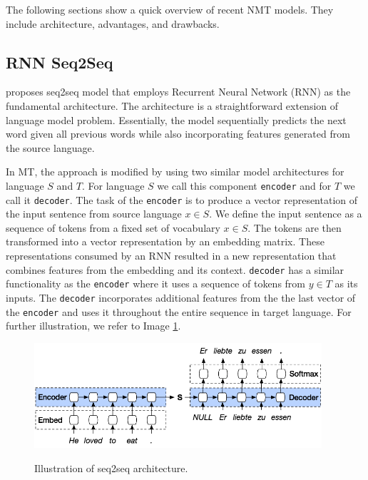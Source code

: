 The following sections show a quick overview of recent NMT models. They include architecture, advantages, and drawbacks.

\subsection{RNN Seq2Seq}
\cite{sutskever2014sequence} proposes seq2seq model that employs Recurrent Neural Network (RNN) as the fundamental architecture. The architecture is a straightforward extension of language model problem. Essentially, the model sequentially predicts the next word given all previous words while also incorporating features generated from the source language.

In MT, the approach is modified by using two similar model architectures for language $S$ and $T$. For language $S$ we call this component \texttt{encoder} and for $T$ we call it \texttt{decoder}.
The task of the \texttt{encoder} is to produce a vector representation of the input sentence from source language $x \in S$. We define the input sentence as a sequence of tokens from a fixed set of vocabulary $x \in S$. The tokens are then transformed into a vector representation by an embedding matrix. These representations consumed by an RNN resulted in a new representation that combines features from the embedding and its context.
\texttt{decoder} has a similar functionality as the \texttt{encoder} where it uses a sequence of tokens from $y \in T$ as its inputs. The \texttt{decoder} incorporates additional features from the the last vector of the \texttt{encoder} and uses it throughout the entire sequence in target language. For further illustration, we refer to Image \ref{img:rnnseq2seq}.

\begin{figure}[h]
    {\includegraphics[width=0.95\textwidth]{img/rnnseq2seq.png}}
    \centering
    \caption{Illustration of seq2seq architecture\protect\footnotemark[1].}
    \label{img:rnnseq2seq}
\end{figure}

